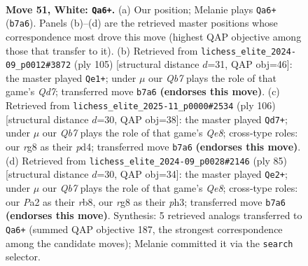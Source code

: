 \documentclass[11pt]{article}
\begin{document}
\clearpage

\begin{figure}[p]\centering
\begin{subfigure}{0.46\textwidth}\centering
\resizebox{\linewidth}{!}{%
\newchessgame
\chessboard[
  setfen={6r1/1Q6/4kp2/3p4/4qP2/p5P1/P6P/6K1 w - - 21 51},
  showmover=false,
  pgfstyle=straightmove, color=movearrow, markmove={b7-a6}
]}
\caption{}
\end{subfigure}\hfill
\begin{subfigure}{0.46\textwidth}\centering
\resizebox{\linewidth}{!}{%
\newchessgame
\chessboard[
  setfen={8/5p1k/5Qp1/1p2P3/5PP1/6K1/3q4/8 b - - 14 53},
  showmover=false,
  pgfstyle=straightmove, color=movearrow, markmove={d2-e1}
]}
\caption{}
\end{subfigure}
\\[4pt]
\begin{subfigure}{0.46\textwidth}\centering
\resizebox{\linewidth}{!}{%
\newchessgame
\chessboard[
  setfen={4Q3/6kp/1p6/6p1/pP1p4/5Pq1/P5P1/6K1 w - - 1 54},
  showmover=false,
  pgfstyle=straightmove, color=movearrow, markmove={e8-d7}
]}
\caption{}
\end{subfigure}\hfill
\begin{subfigure}{0.46\textwidth}\centering
\resizebox{\linewidth}{!}{%
\newchessgame
\chessboard[
  setfen={1R6/5ppk/2p5/4Q3/4P2p/P4P1P/6K1/4q3 b - - 7 43},
  showmover=false,
  pgfstyle=straightmove, color=movearrow, markmove={e1-e2}
]}
\caption{}
\end{subfigure}
\caption{\textbf{Move 51, White: \texttt{Qa6+}.} (a) Our position; Melanie plays \texttt{Qa6+} (\texttt{b7a6}). Panels (b)--(d) are the retrieved master positions whose correspondence most drove this move (highest QAP objective among those that transfer to it). (b) Retrieved from \texttt{lichess\_elite\_2024-09\_p0012\#3872} (ply 105) [structural distance $d$=31, QAP obj=46]: the master played \texttt{Qe1+}; under $\mu$ our \emph{Qb7} plays the role of that game's \emph{Qd7}; transferred move \texttt{b7a6} \textbf{(endorses this move)}. (c) Retrieved from \texttt{lichess\_elite\_2025-11\_p0000\#2534} (ply 106) [structural distance $d$=30, QAP obj=38]: the master played \texttt{Qd7+}; under $\mu$ our \emph{Qb7} plays the role of that game's \emph{Qe8}; cross-type roles: our \emph{r}g8 as their \emph{p}d4; transferred move \texttt{b7a6} \textbf{(endorses this move)}. (d) Retrieved from \texttt{lichess\_elite\_2024-09\_p0028\#2146} (ply 85) [structural distance $d$=30, QAP obj=34]: the master played \texttt{Qe2+}; under $\mu$ our \emph{Qb7} plays the role of that game's \emph{Qe8}; cross-type roles: our \emph{P}a2 as their \emph{r}b8, our \emph{r}g8 as their \emph{p}h3; transferred move \texttt{b7a6} \textbf{(endorses this move)}. Synthesis: 5 retrieved analogs transferred to \texttt{Qa6+} (summed QAP objective 187, the strongest correspondence among the candidate moves); Melanie committed it via the \texttt{search} selector.}
\label{fig:thought-m100}
\end{figure}
\end{document}
